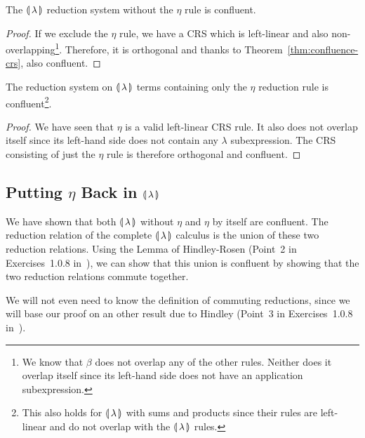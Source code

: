 \begin{lemma}\label{lem:confluence-int}

  The $\llparenthesis \, \lambda \, \rrparenthesis$ reduction system without the $\eta$ rule is
  confluent.
\end{lemma}

\begin{proof}
  If we exclude the $\eta$ rule, we have a CRS which is left-linear and
  also non-overlapping\footnote{We know that $\beta$ does not overlap
    any of the other rules. Neither does it overlap itself since its
    left-hand side does not have an application subexpression.}. Therefore,
  it is orthogonal and thanks to Theorem~\ref{thm:confluence-crs}, also
  confluent.
\end{proof}

\begin{lemma}\label{lem:confluence-eta}

  The reduction system on $\llparenthesis \, \lambda \, \rrparenthesis$ terms containing only the
  $\eta$ reduction rule is confluent\footnote{This also holds for
    $\llparenthesis \, \lambda \, \rrparenthesis$ with sums and products since their rules are
    left-linear and do not overlap with the $\llparenthesis \, \lambda \, \rrparenthesis$ rules.}.
\end{lemma}

\begin{proof}
  We have seen that $\eta$ is a valid left-linear CRS rule. It also
  does not overlap itself since its left-hand side does not contain any
  $\lambda$ subexpression. The CRS consisting of just the $\eta$ rule
  is therefore orthogonal and confluent.
\end{proof}


\subsection{Putting \texorpdfstring{$\eta$}{eta} Back in
  \texorpdfstring{$\llparenthesis \, \lambda \, \rrparenthesis$}{Our Calculus}}
\label{ssec:confluence-eta}

We have shown that both $\llparenthesis \, \lambda \, \rrparenthesis$ without $\eta$ and
$\eta$ by itself are confluent. The reduction relation of the complete
$\llparenthesis \, \lambda \, \rrparenthesis$ calculus is the union of these two reduction
relations. Using the Lemma of Hindley-Rosen (Point~2 in Exercises~1.0.8
in~\cite{klop1992term}), we can show that this union is confluent by
showing that the two reduction relations commute together.

We will not even need to know the definition of commuting reductions, since
we will base our proof on an other result due to Hindley (Point~3 in
Exercises~1.0.8 in~\cite{klop1992term}).

